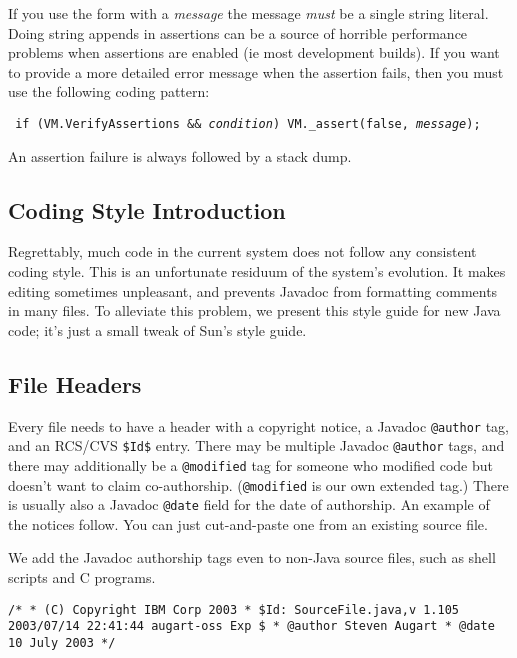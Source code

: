 If you use the form with a {\it message} the message {\em must} be a
single string literal.  Doing string appends in assertions can be a
source of horrible performance problems when assertions are enabled
(ie most development builds).  If you want to provide a
more detailed error message when the assertion fails, then you must
use the following coding pattern:
\begin{example}
\tt{}   if (VM.VerifyAssertions && {\it condition}) VM._assert(false, {\it message});
\end{example}

An assertion failure is always followed by a stack dump.


\subsection{Coding Style Introduction}

Regrettably, much code in the current system does not follow any
consistent coding style.  This is an unfortunate residuum of the
system's evolution.  It makes editing sometimes unpleasant, and
prevents Javadoc\TMweb{} from formatting comments in many files.  To alleviate
this problem, we present this style guide for new Java\TMweb{} code; it's just
a small tweak of Sun\Rweb{}'s style guide.

\subsection{File Headers}

Every file needs to have a header with a copyright notice, a Javadoc\TMweb{}
{\tt @author} tag, and an RCS/CVS {\tt \$Id\$} entry. There may be
multiple Javadoc {\tt @author} tags, and there may
additionally be a {\tt @modified} tag for someone who modified code but
doesn't want to claim co-authorship.  ({\tt @modified} is our own
extended tag.)  There is usually also a Javadoc {\tt @date} field for
the date of authorship.  An example of the notices follow.  You can
just cut-and-paste one from an existing source file.

We add the Javadoc authorship tags even to non-Java\TMweb{} source files, such
as shell scripts and C programs.
\begin{example}
\tt{}/*
 * (C) Copyright IBM Corp 2003
 * \${}Id{}: SourceFile.java,v 1.105 2003/07/14 22:41:44 augart-oss Exp \$
 * @author Steven Augart
 * @date 10 July 2003
 */
\end{example}


%
%

